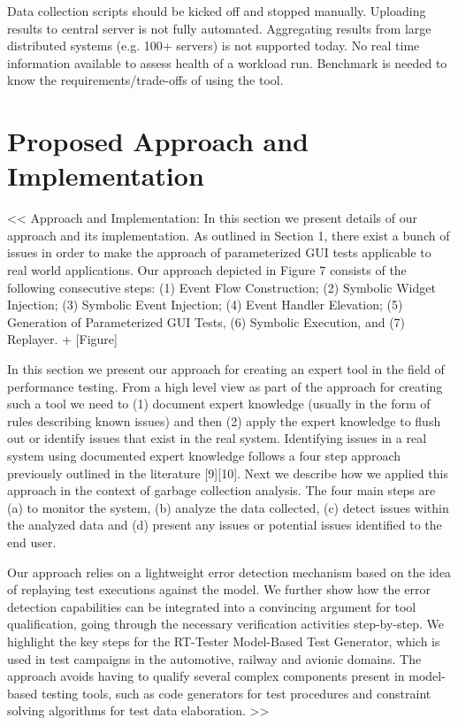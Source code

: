\documentclass[runningheads,a4paper]{llncs}
\begin{document}
Data collection scripts should be kicked off and stopped manually.
Uploading results to central server is not fully automated.
Aggregating results from large distributed systems (e.g. 100+ servers) is not supported today.
No real time information available to assess health of a workload run.
Benchmark is needed to know the requirements/trade-offs of using the tool.




\section{Proposed Approach and Implementation}

<<
Approach and Implementation: In this section we present details of our approach and its 
implementation. As outlined in Section 1, there exist a bunch of issues in order to make the 
approach of parameterized GUI tests applicable to real world applications. Our
approach depicted in Figure 7 consists of the following consecutive steps: (1)
Event Flow Construction; (2) Symbolic Widget Injection; (3) Symbolic Event
Injection; (4) Event Handler Elevation; (5) Generation of Parameterized GUI
Tests, (6) Symbolic Execution, and (7) Replayer. + [Figure]

In this section we present our approach for creating an expert tool in the
field of performance testing. From a high level view as part of the approach for 
creating such a tool we need to (1) document expert knowledge (usually in the form 
of rules describing known issues) and then (2) apply the expert knowledge to flush out 
or identify issues that exist in the real system. Identifying issues in a real system 
using documented expert knowledge follows a four step approach previously outlined in 
the literature [9][10]. Next we describe how we applied this approach in the context of 
garbage collection analysis. The four main steps are (a) to monitor the system, (b) 
analyze the data collected, (c) detect issues within the analyzed data and (d) present 
any issues or potential issues identified to the end user.

Our approach relies on a lightweight error detection mechanism based on the idea 
of replaying test executions against the model. We further show how the
error detection capabilities can be integrated into a convincing argument
for tool qualification, going through the necessary verification activities
step-by-step. We highlight the key steps for the RT-Tester Model-Based
Test Generator, which is used in test campaigns in the automotive, railway
and avionic domains. The approach avoids having to qualify several
complex components present in model-based testing tools, such as code
generators for test procedures and constraint solving algorithms for test
data elaboration.
>>
\end{document}
